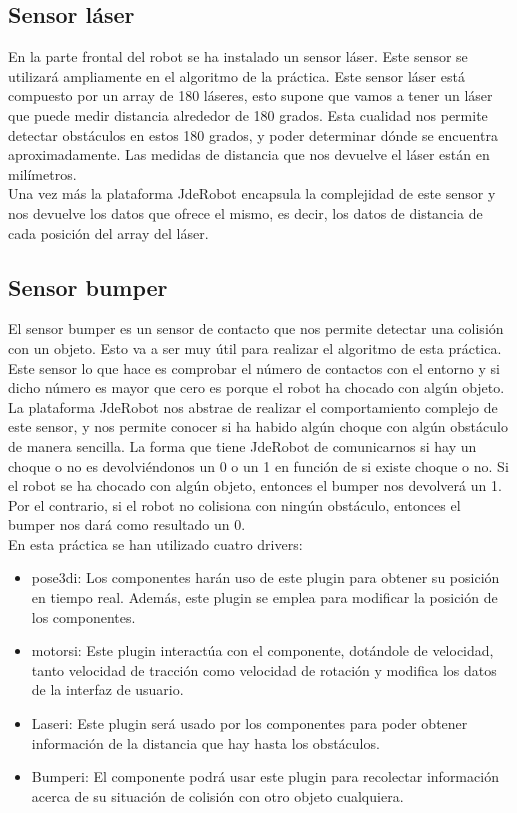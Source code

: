 \subsection{Sensor láser}
En la parte frontal del robot se ha instalado un sensor láser. Este sensor se utilizará ampliamente en el algoritmo de la práctica. Este sensor láser está compuesto por un array de 180 láseres, esto supone que vamos a tener un láser que puede medir distancia alrededor de 180 grados. Esta cualidad nos permite detectar obstáculos en estos 180 grados, y poder determinar dónde se encuentra aproximadamente. Las medidas de distancia que nos devuelve el láser están en milímetros.\\

Una vez más la plataforma JdeRobot encapsula la complejidad de este sensor y nos devuelve los datos que ofrece el mismo, es decir, los datos de distancia de cada posición del array del láser. 

\subsection{Sensor bumper}
El sensor bumper es un sensor de contacto que nos permite detectar una colisión con un objeto. Esto va a ser muy útil para realizar el algoritmo de esta práctica. Este sensor lo que hace es comprobar el número de contactos con el entorno y si dicho número es mayor que cero es porque el robot ha chocado con algún objeto. La plataforma JdeRobot nos abstrae de realizar el comportamiento complejo de este sensor, y nos permite conocer si ha habido algún choque con algún obstáculo de manera sencilla. La forma que tiene JdeRobot de comunicarnos si hay un choque o no es devolviéndonos un 0 o un 1 en función de si existe choque o no. Si el robot se ha chocado con algún objeto, entonces el bumper nos devolverá un 1. Por el contrario, si el robot no colisiona con ningún obstáculo, entonces el bumper nos dará como resultado un 0.\\

En esta práctica se han utilizado cuatro drivers: 

\begin{itemize}
\item pose3di: Los componentes harán uso de este plugin para obtener su posición en tiempo real. Además, este plugin se emplea para modificar la posición de los componentes.
\item motorsi: Este plugin interactúa con el componente, dotándole de velocidad, tanto velocidad de tracción como velocidad de rotación y modifica los datos de la interfaz de usuario.
\item Laseri: Este plugin será usado por los componentes para poder obtener información de la distancia que hay hasta los obstáculos.
\item Bumperi: El componente podrá usar este plugin para recolectar información acerca de su situación de colisión con otro objeto cualquiera.
\end{itemize}

